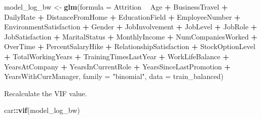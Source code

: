 \documentclass[
]{article}
\newenvironment{Shaded}{\begin{snugshade}}{\end{snugshade}}
\newcommand{\DataTypeTok}[1]{\textcolor[rgb]{0.13,0.29,0.53}{#1}}
\newcommand{\KeywordTok}[1]{\textcolor[rgb]{0.13,0.29,0.53}{\textbf{#1}}}
\newcommand{\NormalTok}[1]{#1}
\newcommand{\OperatorTok}[1]{\textcolor[rgb]{0.81,0.36,0.00}{\textbf{#1}}}
\newcommand{\StringTok}[1]{\textcolor[rgb]{0.31,0.60,0.02}{#1}}
\begin{document}
\begin{Shaded}
\begin{Highlighting}[]
\NormalTok{model_log_bw <-}\StringTok{ }\KeywordTok{glm}\NormalTok{(}\DataTypeTok{formula =}\NormalTok{ Attrition }\OperatorTok{~}\StringTok{ }\NormalTok{Age }\OperatorTok{+}\StringTok{ }\NormalTok{BusinessTravel }\OperatorTok{+}\StringTok{ }\NormalTok{DailyRate }\OperatorTok{+}\StringTok{ }
\StringTok{    }\NormalTok{DistanceFromHome }\OperatorTok{+}\StringTok{ }\NormalTok{EducationField }\OperatorTok{+}\StringTok{ }\NormalTok{EmployeeNumber }\OperatorTok{+}\StringTok{ }
\StringTok{    }\NormalTok{EnvironmentSatisfaction }\OperatorTok{+}\StringTok{ }\NormalTok{Gender }\OperatorTok{+}\StringTok{ }\NormalTok{JobInvolvement }\OperatorTok{+}\StringTok{ }\NormalTok{JobLevel }\OperatorTok{+}\StringTok{ }
\StringTok{    }\NormalTok{JobRole }\OperatorTok{+}\StringTok{ }\NormalTok{JobSatisfaction }\OperatorTok{+}\StringTok{ }\NormalTok{MaritalStatus }\OperatorTok{+}\StringTok{ }\NormalTok{MonthlyIncome }\OperatorTok{+}\StringTok{ }
\StringTok{    }\NormalTok{NumCompaniesWorked }\OperatorTok{+}\StringTok{ }\NormalTok{OverTime }\OperatorTok{+}\StringTok{ }\NormalTok{PercentSalaryHike }\OperatorTok{+}\StringTok{ }\NormalTok{RelationshipSatisfaction }\OperatorTok{+}\StringTok{ }
\StringTok{    }\NormalTok{StockOptionLevel }\OperatorTok{+}\StringTok{ }\NormalTok{TotalWorkingYears }\OperatorTok{+}\StringTok{ }\NormalTok{TrainingTimesLastYear }\OperatorTok{+}\StringTok{ }
\StringTok{    }\NormalTok{WorkLifeBalance }\OperatorTok{+}\StringTok{ }\NormalTok{YearsAtCompany }\OperatorTok{+}\StringTok{ }\NormalTok{YearsInCurrentRole }\OperatorTok{+}\StringTok{ }\NormalTok{YearsSinceLastPromotion }\OperatorTok{+}\StringTok{ }
\StringTok{    }\NormalTok{YearsWithCurrManager, }\DataTypeTok{family =} \StringTok{"binomial"}\NormalTok{, }\DataTypeTok{data =}\NormalTok{ train_balanced)}
\end{Highlighting}
\end{Shaded}

Recalculate the VIF value.

\begin{Shaded}
\begin{Highlighting}[]
\NormalTok{car}\OperatorTok{::}\KeywordTok{vif}\NormalTok{(model_log_bw)}
\end{Highlighting}
\end{Shaded}
\end{document}

